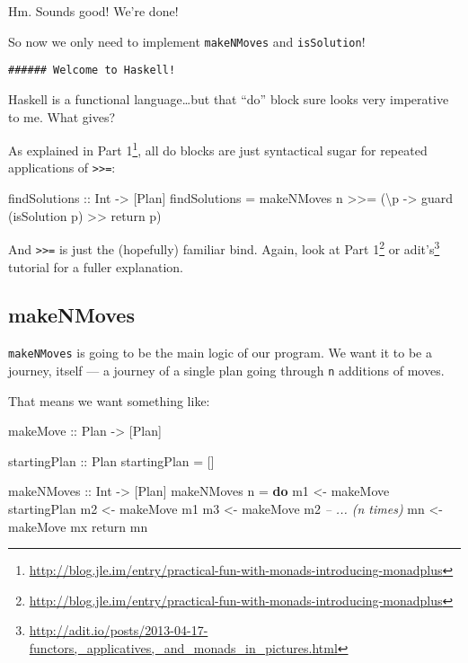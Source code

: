 \documentclass[]{article}
\newenvironment{Shaded}{}{}
\newcommand{\KeywordTok}[1]{\textcolor[rgb]{0.00,0.44,0.13}{\textbf{{#1}}}}
\newcommand{\DataTypeTok}[1]{\textcolor[rgb]{0.56,0.13,0.00}{{#1}}}
\newcommand{\CommentTok}[1]{\textcolor[rgb]{0.38,0.63,0.69}{\textit{{#1}}}}
\newcommand{\OtherTok}[1]{\textcolor[rgb]{0.00,0.44,0.13}{{#1}}}
\newcommand{\FunctionTok}[1]{\textcolor[rgb]{0.02,0.16,0.49}{{#1}}}
\newcommand{\NormalTok}[1]{{#1}}
\renewcommand{\href}[2]{#2\footnote{\url{#1}}}
\begin{document}
Hm. Sounds good! We're done!

So now we only need to implement \texttt{makeNMoves} and \texttt{isSolution}!

\begin{verbatim}
###### Welcome to Haskell!
\end{verbatim}

Haskell is a functional language\ldots{}but that ``do'' block sure looks very
imperative to me. What gives?

As explained in
\href{http://blog.jle.im/entry/practical-fun-with-monads-introducing-monadplus}{Part
1}, all do blocks are just syntactical sugar for repeated applications of
\texttt{\textgreater{}\textgreater{}=}:

\begin{Shaded}
\begin{Highlighting}[]
\OtherTok{findSolutions ::} \DataTypeTok{Int} \OtherTok{->} \NormalTok{[}\DataTypeTok{Plan}\NormalTok{]}
\NormalTok{findSolutions }\FunctionTok{=}
    \NormalTok{makeNMoves n }\FunctionTok{>>=} \NormalTok{(\textbackslash{}p }\OtherTok{->} \NormalTok{guard (isSolution p) }\FunctionTok{>>} \NormalTok{return p)}
\end{Highlighting}
\end{Shaded}

And \texttt{\textgreater{}\textgreater{}=} is just the (hopefully) familiar
bind. Again, look at
\href{http://blog.jle.im/entry/practical-fun-with-monads-introducing-monadplus}{Part
1} or
\href{http://adit.io/posts/2013-04-17-functors,_applicatives,_and_monads_in_pictures.html}{adit's}
tutorial for a fuller explanation.

\subsection{makeNMoves}\label{makenmoves}

\texttt{makeNMoves} is going to be the main logic of our program. We want it to
be a journey, itself --- a journey of a single plan going through \texttt{n}
additions of moves.

That means we want something like:

\begin{Shaded}
\begin{Highlighting}[]
\OtherTok{makeMove ::} \DataTypeTok{Plan} \OtherTok{->} \NormalTok{[}\DataTypeTok{Plan}\NormalTok{]}

\OtherTok{startingPlan ::} \DataTypeTok{Plan}
\NormalTok{startingPlan }\FunctionTok{=} \NormalTok{[]}

\OtherTok{makeNMoves ::} \DataTypeTok{Int} \OtherTok{->} \NormalTok{[}\DataTypeTok{Plan}\NormalTok{]}
\NormalTok{makeNMoves n }\FunctionTok{=} \KeywordTok{do}
    \NormalTok{m1 }\OtherTok{<-} \NormalTok{makeMove startingPlan}
    \NormalTok{m2 }\OtherTok{<-} \NormalTok{makeMove m1}
    \NormalTok{m3 }\OtherTok{<-} \NormalTok{makeMove m2}
    \CommentTok{-- ... (n times)}
    \NormalTok{mn }\OtherTok{<-} \NormalTok{makeMove mx}
    \NormalTok{return mn}
\end{Highlighting}
\end{Shaded}
\end{document}
